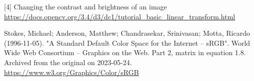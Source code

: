 \documentclass{article}
\begin{document}
[4] Changing the contrast and brightness of an image \url{https://docs.opencv.org/3.4/d3/dc1/tutorial_basic_linear_transform.html} 
% 
% 
\begin{thebibliography}{9}
Stokes, Michael; Anderson, Matthew; Chandrasekar, Srinivasan; Motta, Ricardo (1996-11-05). "A Standard Default Color Space for the Internet – sRGB". World Wide Web Consortium – Graphics on the Web. Part 2, matrix in equation 1.8. Archived from the original on 2023-05-24.
  \url{https://www.w3.org/Graphics/Color/sRGB}
\end{thebibliography}


  
\end{document}
